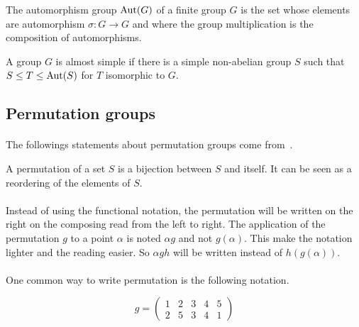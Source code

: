 \begin{definition}
  The automorphism group $\operatorname{Aut}(G)$ of a finite group $G$ is the set whose elements are automorphism $\sigma : G \to G$ and where the group multiplication is the composition of automorphisms.
\end{definition}

\begin{definition}
  A group $G$ is almost simple if there is a simple non-abelian group $S$ such that $S \le T \le \operatorname{Aut}(S)$ for $T$ isomorphic to $G$.
\end{definition}

\subsection{Permutation groups}

\paragraph{}
The followings statements about permutation groups come from~\cite{cameronPermutationGroups}.

\begin{definition}[Permutation]
  A permutation of a set $S$ is a bijection between $S$ and itself. It can be seen as a reordering of the elements of $S$.
\end{definition}

\paragraph{}
Instead of using the functional notation, the permutation will be written on the right on the composing read from the left to right. The application of the permutation $g$ to a point $\alpha$ is noted $\alpha g$ and not $g(\alpha)$. This make the notation lighter and the reading easier. So $\alpha gh$ will be written instead of $h(g(\alpha))$.

\paragraph{}
One common way to write permutation is the following notation.

\[
  g =
  \left(
    \begin{array}{ccccc}
      1 & 2 & 3 & 4 & 5\\
      2 & 5 & 3 & 4 & 1
    \end{array}
  \right)
\]

